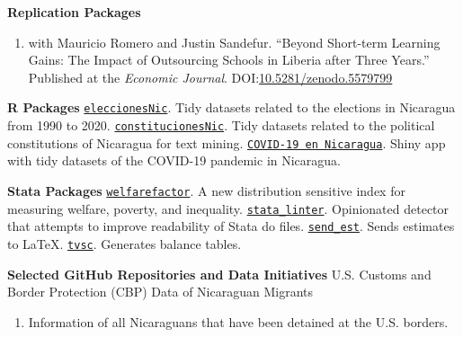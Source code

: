 \documentclass[a4paper,10pt]{article}
\renewenvironment{itemize}{
  \begin{list}{}
    { \setlength{\itemsep}{5pt}
      \setlength{\parsep}{0pt}
      \setlength{\topsep}{0pt}
      \setlength{\leftmargin}{0em} } }{
  \end{list}}
\begin{document}
\begin{itemize}
  \item \textbf{Replication Packages}
  \begin{enumerate}[leftmargin=10pt, label={}, itemindent=-10pt, nosep]
    \item with Mauricio Romero and Justin Sandefur. ``Beyond Short-term Learning Gains: The Impact of Outsourcing Schools in Liberia after Three Years.'' Published at the \textit{Economic Journal}. DOI:\href{https://doi.org/10.5281/zenodo.5579799}{10.5281/zenodo.5579799}
  \end{enumerate}
  \item \textbf{R Packages} \newline \texttt{\href{https://github.com/RRMaximiliano/eleccionesNic}{eleccionesNic}}. Tidy datasets related to the elections in Nicaragua from 1990 to 2020. \newline \texttt{\href{https://github.com/RRMaximiliano/constitucionesNic}{constitucionesNic}}. Tidy datasets related to the political constitutions of Nicaragua for text mining. \newline \texttt{\href{https://rrmaximiliano.shinyapps.io/covid-nicaragua/}{COVID-19 en Nicaragua}}. Shiny app with tidy datasets of the COVID-19 pandemic in Nicaragua.
  \item \textbf{Stata Packages} \newline
  \texttt{\href{https://github.com/RRMaximiliano/welfarefactor}{welfarefactor}}.
  A new distribution sensitive index for measuring welfare, poverty, and
  inequality.
  \newline \texttt{\href{https://github.com/worldbank/stata-linter}
  {stata\_linter}}. Opinionated detector that attempts to improve readability of Stata do files. \newline \texttt{\href{https://github.com/RRMaximiliano/send\_est}{send\_est}}. Sends estimates to \LaTeX. \newline \texttt{\href{https://github.com/RRMaximiliano/tvsc}{tvsc}}. Generates balance tables.
   \item \textbf{Selected GitHub Repositories and Data Initiatives}
   \newline U.S. Customs and Border Protection (CBP) Data of Nicaraguan Migrants \href{https://github.com/RRMaximiliano/migrants_usbp}{\faGithub}
   \begin{enumerate}[label = {-}]
    \item Information of all Nicaraguans that have been detained at the U.S. borders.
   \end{enumerate}

\end{itemize}
\end{document}
